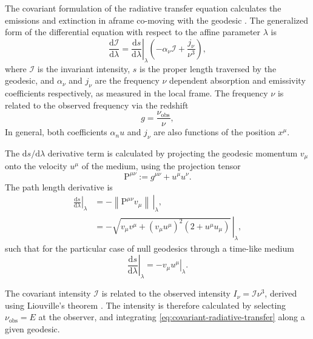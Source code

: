 \documentclass[fleqn,usenatbib]{mnras}
\renewcommand{\d}{\text{d}}
\begin{document}
The covariant formulation of the radiative transfer equation calculates the emissions and extinction in aframe co-moving with the geodesic \citep{fuerst_radiation_2004,younsi_general_2012}. The generalized form of the differential equation with respect to the affine parameter $\lambda$ is
\begin{equation}
    \label{eq:covariant-radiative-transfer}
    \frac{\d \mathcal{I}}{\d \lambda} = \left. \frac{\d s}{\d \lambda} \right\rvert_\lambda \left( -\alpha_\nu \mathcal{I} + \frac{j_\nu}{\nu^3} \right),
\end{equation}
where $\mathcal{I}$ is the invariant intensity, $s$ is the proper length traversed by the geodesic, and $\alpha_\nu$ and $j_\nu$ are the frequency $\nu$ dependent absorption and emissivity coefficients respectively, as measured in the local frame. The frequency $\nu$ is related to the observed frequency via the redshift
\begin{equation}
    g = \frac{\nu_\text{obs}}{\nu},
\end{equation}
In general, both coefficients $\alpha_nu$ and $j_\nu$ are also functions of the position $x^\mu$.

The $\d s / \d \lambda$ derivative term is calculated by projecting the geodesic momentum $v_\mu$ onto the velocity $u^\mu$ of the medium, using the projection tensor
\begin{equation}
    \mathrm{P}^{\mu\nu} := g^{\mu\nu} + u^\mu u^\nu.
\end{equation}
The path length derivative is
\begin{align}
    \left. \frac{\d s}{\d \lambda} \right\rvert_\lambda
    &= - \left. \left\lVert \mathrm{P}^{\mu\nu} v_\mu\right\rVert\, \right\rvert_\lambda,\\
    &= - \left. \sqrt{v_\mu v^\mu + \left(v_\mu u^\mu\right)^2 \left(2 + u^\mu u_\mu\right)} \, \right\rvert_\lambda,
\end{align}
such that for the particular case of null geodesics through a time-like medium
\begin{equation}
    \left. \frac{\d s}{\d \lambda} \right\rvert_\lambda = - \left. v_\mu u^\mu \right\rvert_\lambda.
\end{equation}

The covariant intensity $\mathcal{I}$ is related to the observed intensity $I_\nu = \mathcal{I} \nu^3$, derived using Liouville's theorem \citep{todo}. The intensity is therefore calculated by selecting $\nu_\text{obs} = E$ at the observer, and integrating \eqref{eq:covariant-radiative-transfer} along a given geodesic.
\end{document}
